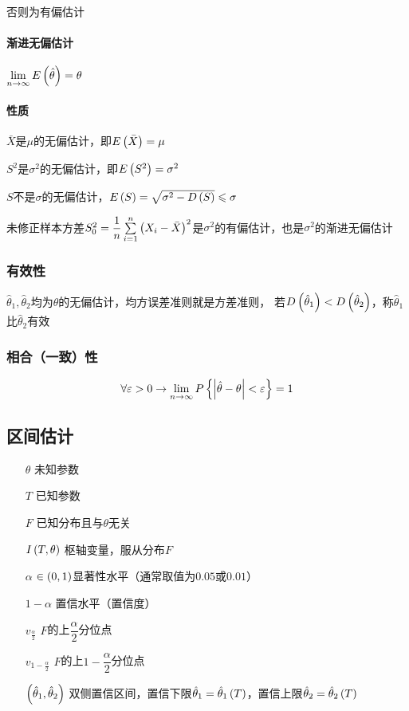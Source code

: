 \documentclass{article}
\begin{document}
否则为有偏估计

\paragraph{渐进无偏估计}$\lim\limits_{n\to\infty}E\left(\hat\theta\right)=\theta$

\paragraph{性质}

$\bar X$是$\mu$的无偏估计，即$E\left(\bar X\right)=\mu$

$S^2$是$\sigma^2$的无偏估计，即$E\left(S^2\right)=\sigma^2$

$S$不是$\sigma$的无偏估计，$E\left(S\right)=\sqrt{\sigma^2-D\left(S\right)}\leqslant\sigma$

未修正样本方差$S_0^2=\dfrac1n\sum\limits_{i=1}^n{\left(X_i-\bar X\right)}^2$是$\sigma^2$的有偏估计，也是$\sigma^2$的渐进无偏估计

\subsubsection{有效性}

$\hat\theta_1,\hat\theta_2$均为$\theta$的无偏估计，均方误差准则就是方差准则，
若$D\left(\hat\theta_1\right)<D\left(\hat\theta_2\right)$，称$\hat\theta_1$比$\hat\theta_2$有效

\subsubsection{相合（一致）性}

\[\forall\varepsilon>0\to\lim\limits_{n\to\infty}P\left\{\left|\hat\theta-\theta\right|<\varepsilon\right\}=1\]

\subsection{区间估计}

\begin{enumerate}
    \item [$\theta$] 未知参数
    \item [$T$] 已知参数
    \item [$F$] 已知分布且与$\theta$无关
    \item [$I\left(T,\theta\right)$] 枢轴变量，服从分布$F$
    \item [$\alpha$] $\in\left(0,1\right)$显著性水平（通常取值为$0.05$或$0.01$）
    \item [$1-\alpha$] 置信水平（置信度）
    \item [$v_\frac\alpha2$] $F$的上$\dfrac\alpha2$分位点
    \item [$v_{1-\frac\alpha2}$] $F$的上$1-\dfrac\alpha2$分位点
    \item [$\left(\hat\theta_1,\hat\theta_2\right)$] 双侧置信区间，置信下限$\hat\theta_1=\hat\theta_1\left(T\right)$，置信上限$\hat\theta_2=\hat\theta_2\left(T\right)$
\end{enumerate}
\end{document}
